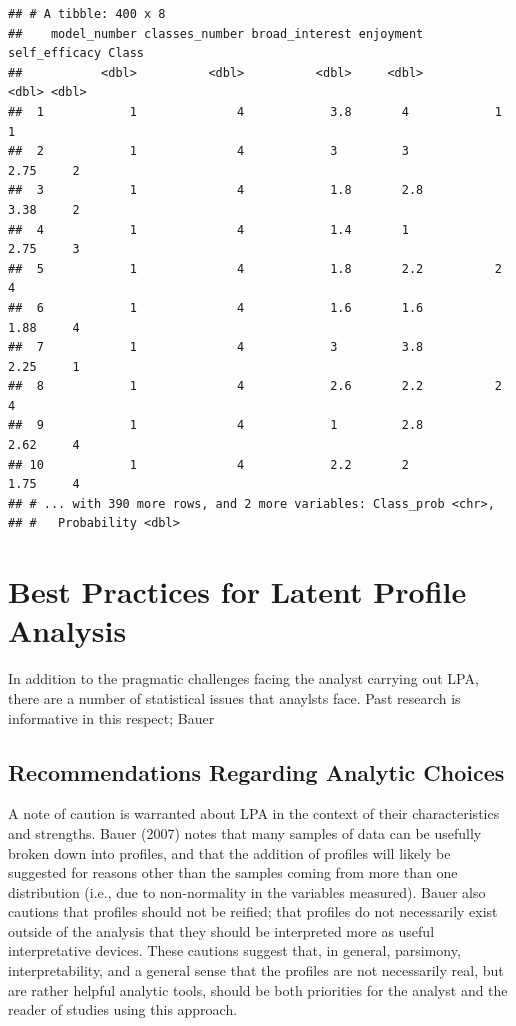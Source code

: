 \documentclass[man]{apa6}
\begin{document}
\begin{verbatim}
## # A tibble: 400 x 8
##    model_number classes_number broad_interest enjoyment self_efficacy Class
##           <dbl>          <dbl>          <dbl>     <dbl>         <dbl> <dbl>
##  1            1              4            3.8       4            1        1
##  2            1              4            3         3            2.75     2
##  3            1              4            1.8       2.8          3.38     2
##  4            1              4            1.4       1            2.75     3
##  5            1              4            1.8       2.2          2        4
##  6            1              4            1.6       1.6          1.88     4
##  7            1              4            3         3.8          2.25     1
##  8            1              4            2.6       2.2          2        4
##  9            1              4            1         2.8          2.62     4
## 10            1              4            2.2       2            1.75     4
## # ... with 390 more rows, and 2 more variables: Class_prob <chr>,
## #   Probability <dbl>
\end{verbatim}

\hypertarget{best-practices-for-latent-profile-analysis}{%
\section{Best Practices for Latent Profile Analysis}\label{best-practices-for-latent-profile-analysis}}

In addition to the pragmatic challenges facing the analyst carrying out LPA, there
are a number of statistical issues that anaylsts face. Past research is informative in
this respect; Bauer

\hypertarget{recommendations-regarding-analytic-choices}{%
\subsection{Recommendations Regarding Analytic Choices}\label{recommendations-regarding-analytic-choices}}

A note of caution is warranted about LPA in the context of their characteristics
and strengths. Bauer (2007) notes that many samples of data can be usefully
broken down into profiles, and that the addition of profiles will likely be
suggested for reasons other than the samples coming from more than one
distribution (i.e., due to non-normality in the variables measured). Bauer also
cautions that profiles should not be reified; that profiles do not necessarily
exist outside of the analysis that they should be interpreted more as useful
interpretative devices. These cautions suggest that, in general, parsimony,
interpretability, and a general sense that the profiles are not necessarily
real, but are rather helpful analytic tools, should be both priorities for the
analyst and the reader of studies using this approach.
\end{document}
